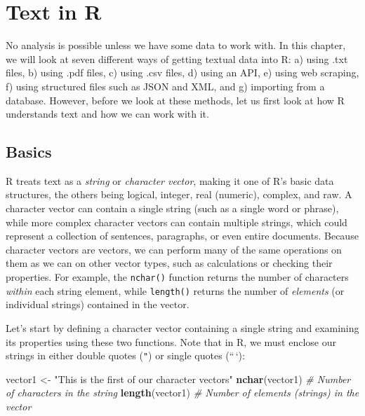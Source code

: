 \documentclass[
]{book}
\newenvironment{Shaded}{\begin{snugshade}}{\end{snugshade}}
\newcommand{\CommentTok}[1]{\textcolor[rgb]{0.56,0.35,0.01}{\textit{#1}}}
\newcommand{\FunctionTok}[1]{\textcolor[rgb]{0.13,0.29,0.53}{\textbf{#1}}}
\newcommand{\NormalTok}[1]{#1}
\newcommand{\OtherTok}[1]{\textcolor[rgb]{0.56,0.35,0.01}{#1}}
\newcommand{\StringTok}[1]{\textcolor[rgb]{0.31,0.60,0.02}{#1}}
\begin{document}
\chapter{Text in R}\label{import}

No analysis is possible unless we have some data to work with. In this chapter, we will look at seven different ways of getting textual data into R: a) using .txt files, b) using .pdf files, c) using .csv files, d) using an API, e) using web scraping, f) using structured files such as JSON and XML, and g) importing from a database. However, before we look at these methods, let us first look at how R understands text and how we can work with it.

\section{Basics}\label{basics}

R treats text as a \emph{string} or \emph{character vector}, making it one of R's basic data structures, the others being logical, integer, real (numeric), complex, and raw. A character vector can contain a single string (such as a single word or phrase), while more complex character vectors can contain multiple strings, which could represent a collection of sentences, paragraphs, or even entire documents. Because character vectors are vectors, we can perform many of the same operations on them as we can on other vector types, such as calculations or checking their properties. For example, the \texttt{nchar()} function returns the number of characters \emph{within} each string element, while \texttt{length()} returns the number of \emph{elements} (or individual strings) contained in the vector.

Let's start by defining a character vector containing a single string and examining its properties using these two functions. Note that in R, we must enclose our strings in either double quotes (\texttt{"}) or single quotes (``\,`):

\begin{Shaded}
\begin{Highlighting}[]
\NormalTok{vector1 }\OtherTok{\textless{}{-}} \StringTok{"This is the first of our character vectors"}
\FunctionTok{nchar}\NormalTok{(vector1)  }\CommentTok{\# Number of characters in the string}
\FunctionTok{length}\NormalTok{(vector1)  }\CommentTok{\# Number of elements (strings) in the vector}
\end{Highlighting}
\end{Shaded}
\end{document}
